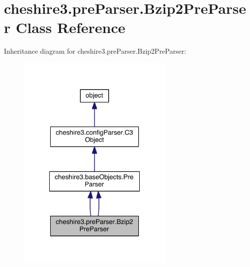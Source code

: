 \hypertarget{classcheshire3_1_1pre_parser_1_1_bzip2_pre_parser}{\section{cheshire3.\-pre\-Parser.\-Bzip2\-Pre\-Parser Class Reference}
\label{classcheshire3_1_1pre_parser_1_1_bzip2_pre_parser}
}


Inheritance diagram for cheshire3.\-pre\-Parser.\-Bzip2\-Pre\-Parser\-:
\nopagebreak
\begin{figure}[H]
\begin{center}
\leavevmode
\includegraphics[width=216pt]{classcheshire3_1_1pre_parser_1_1_bzip2_pre_parser__inherit__graph}
\end{center}
\end{figure}


